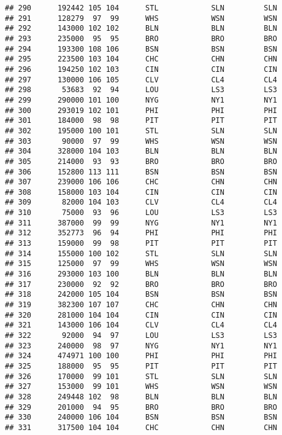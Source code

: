 \documentclass[]{article}
\begin{document}
\begin{verbatim}
## 290      192442 105 104      STL            SLN         SLN
## 291      128279  97  99      WHS            WSN         WSN
## 292      143000 102 102      BLN            BLN         BLN
## 293      235000  95  95      BRO            BRO         BRO
## 294      193300 108 106      BSN            BSN         BSN
## 295      223500 103 104      CHC            CHN         CHN
## 296      194250 102 103      CIN            CIN         CIN
## 297      130000 106 105      CLV            CL4         CL4
## 298       53683  92  94      LOU            LS3         LS3
## 299      290000 101 100      NYG            NY1         NY1
## 300      293019 102 101      PHI            PHI         PHI
## 301      184000  98  98      PIT            PIT         PIT
## 302      195000 100 101      STL            SLN         SLN
## 303       90000  97  99      WHS            WSN         WSN
## 304      328000 104 103      BLN            BLN         BLN
## 305      214000  93  93      BRO            BRO         BRO
## 306      152800 113 111      BSN            BSN         BSN
## 307      239000 106 106      CHC            CHN         CHN
## 308      158000 103 104      CIN            CIN         CIN
## 309       82000 104 103      CLV            CL4         CL4
## 310       75000  93  96      LOU            LS3         LS3
## 311      387000  99  99      NYG            NY1         NY1
## 312      352773  96  94      PHI            PHI         PHI
## 313      159000  99  98      PIT            PIT         PIT
## 314      155000 100 102      STL            SLN         SLN
## 315      125000  97  99      WHS            WSN         WSN
## 316      293000 103 100      BLN            BLN         BLN
## 317      230000  92  92      BRO            BRO         BRO
## 318      242000 105 104      BSN            BSN         BSN
## 319      382300 107 107      CHC            CHN         CHN
## 320      281000 104 104      CIN            CIN         CIN
## 321      143000 106 104      CLV            CL4         CL4
## 322       92000  94  97      LOU            LS3         LS3
## 323      240000  98  97      NYG            NY1         NY1
## 324      474971 100 100      PHI            PHI         PHI
## 325      188000  95  95      PIT            PIT         PIT
## 326      170000  99 101      STL            SLN         SLN
## 327      153000  99 101      WHS            WSN         WSN
## 328      249448 102  98      BLN            BLN         BLN
## 329      201000  94  95      BRO            BRO         BRO
## 330      240000 106 104      BSN            BSN         BSN
## 331      317500 104 104      CHC            CHN         CHN

\end{verbatim}
\end{document}
